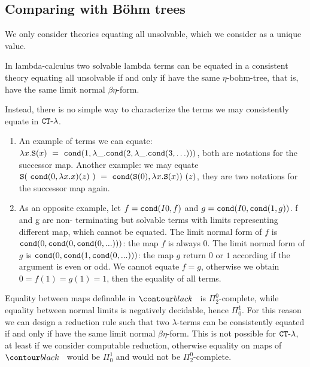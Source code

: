 \subsection{Comparing with B\"{o}hm trees}

      We only consider theories equating all unsolvable, which we consider as a unique
       value.
      
      In lambda-calculus two solvable lambda terms can be equated in a consistent 
      theory equating all unsolvable if and only if have the same  
      $\eta$-bohm-tree, that is, have the same limit normal $\beta\eta$-form. 
 
      Instead, there is no simple way to characterize the terms
      we may consistently equate in ${ {\tt CT}\mbox{-}\lambda}$. 
      
      \begin{enumerate}
      \item
      An example of terms we can equate:
$\lambda x.{\tt S}(x) \ = \ {\tt cond}(1, \lambda \_. {\tt cond}(2, \lambda \_. {\tt cond}(3, \ldots)))$, both are
notations for the successor map. Another example: we may 
equate $\Succ(\ \cond(0,\lambda x.x)(z) \ ) \ = \ \cond(\Succ(0),\lambda x.\Succ(x)) \  (z)$,
they are two notations for the successor map again.
\item
      As an opposite example, let $f = {\tt cond}(I0,f)$ and $g = {\tt cond}(I0,{\tt cond}(1,g))$. f and g are non-
terminating but solvable terms with limits representing different map, which cannot be equated. 
The limit normal form of $f$ is ${\tt cond}(0,{\tt cond}(0, {\tt cond}(0, ...)))$: the map $f$ is always $0$.
The limit normal form of $g$ is ${\tt cond}(0,{\tt cond}(1, {\tt cond}(0, ...)))$: the map $g$ return $0$ or $1$
according if the argument is even or odd. We cannot equate $f=g$,
otherwise we obtain $0 = f(1) = g(1) = 1$, then the equality of all terms.
\end{enumerate}
 
Equality between maps definable in $\systemT$ is $\Pi^0_2$-complete, while equality between
normal limits is negatively decidable, hence $\Pi^1_0$. For this reason we can design a reduction
rule such that two $\lambda$-terms can be consistently equated if and only if 
have the same limit normal $\beta\eta$-form. This is not possible for ${ {\tt CT}\mbox{-}\lambda}$,
at least if we consider computable reduction, otherwise equality on maps of $\systemT$
would be $\Pi^1_0$ and would not be $\Pi^0_2$-complete.
 
  

